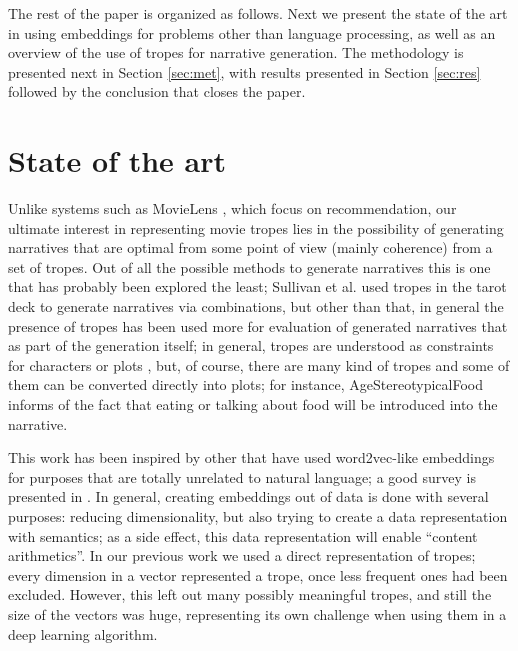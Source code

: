 \documentclass[letterpaper]{article}
\begin{document}
	
	
The rest of the paper is organized as follows. Next we present the
state of the art in using embeddings for problems other than language
processing, as well as an overview of the use of tropes for narrative
generation. The methodology is presented next in Section
\ref{sec:met}, with results presented in Section \ref{sec:res}
followed by the conclusion that closes the paper.

        
\section{State of the art}

Unlike systems such as MovieLens \cite{10.1145/2827872}, which focus
on recommendation, our ultimate
interest in representing movie tropes lies in the possibility of
generating narratives \cite{10.5555/931357} that are optimal from some point of view (mainly
coherence) from a set of tropes. Out of all the possible methods to
generate narratives \cite{van2019narrative} this is one that has
probably been explored the least; Sullivan et
al. \cite{10.1145/3235765.3235819} used tropes in the tarot deck to
generate narratives via combinations, but other than that, in general
the presence of tropes has been used more for evaluation of generated
narratives \cite{gervas2012story} that as part of the generation
itself; in general, tropes are understood as constraints for
characters or plots \cite{Thompson18NarrativeEvents}, but, of course,
there are many kind of tropes and some of them can be converted
directly into plots; for instance, {\sf AgeStereotypicalFood} informs
of the fact that eating or talking about food will be introduced into
the narrative.

        This work has been inspired by other that have used
        word2vec-like embeddings for purposes that are totally
        unrelated to natural language; a good survey is presented in
        \cite{nonnlp19}. In general, creating embeddings out of data
        is done with several purposes: reducing dimensionality, but
        also trying to create a data representation with semantics; as
        a side effect, this data representation will enable ``content
        arithmetics''. In our previous work
        \cite{doi:10.1111/exsy.12525} we used a direct representation
        of tropes; every dimension in a vector represented a trope,
        once less frequent ones had been excluded. However, this left
        out many possibly meaningful tropes, and still the size of the
        vectors was huge, representing its own challenge when using
        them in a deep learning algorithm.
\end{document}

